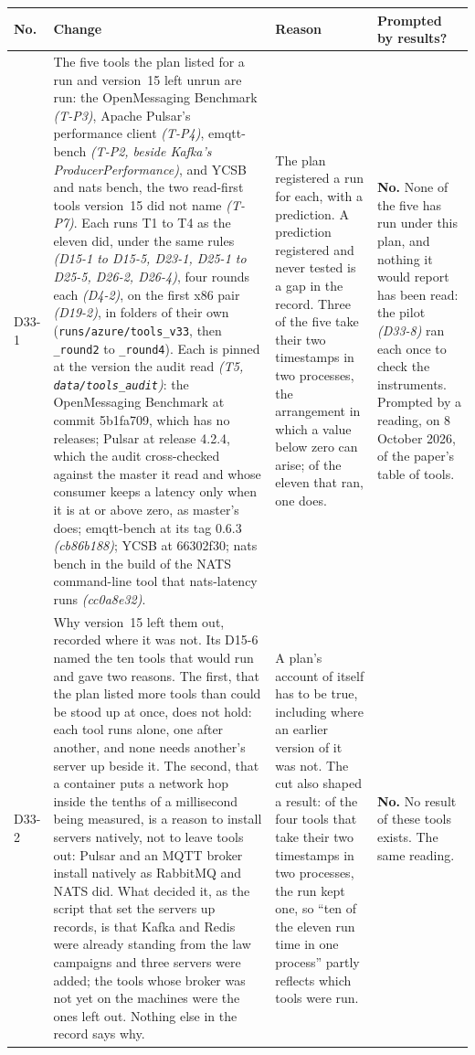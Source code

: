 \documentclass[11pt]{article}
\newcommand{\gl}[1]{{\color{soft}\itshape\small (#1)}}
\begin{document}
{\small
\begin{longtable}{@{}p{1.1cm} >{\raggedright\arraybackslash}p{6.1cm} >{\raggedright\arraybackslash}p{6.0cm} >{\raggedright\arraybackslash}p{2.2cm}@{}}
\toprule
\textbf{No.} & \textbf{Change} & \textbf{Reason} & \textbf{Prompted by results?} \\
\midrule
\endhead
D33-1 & The five tools the plan listed for a run and version~15 left unrun are run: the OpenMessaging Benchmark \gl{T-P3}, Apache Pulsar's performance client \gl{T-P4}, emqtt-bench \gl{T-P2, beside Kafka's ProducerPerformance}, and YCSB and nats bench, the two read-first tools version~15 did not name \gl{T-P7}. Each runs T1 to T4 as the eleven did, under the same rules \gl{D15-1 to D15-5, D23-1, D25-1 to D25-5, D26-2, D26-4}, four rounds each \gl{D4-2}, on the first x86 pair \gl{D19-2}, in folders of their own (\texttt{runs/azure/tools\_v33}, then \texttt{\_round2} to \texttt{\_round4}). Each is pinned at the version the audit read \gl{T5, \texttt{data/tools\_audit}}: the OpenMessaging Benchmark at commit 5b1fa709, which has no releases; Pulsar at release 4.2.4, which the audit cross-checked against the master it read and whose consumer keeps a latency only when it is at or above zero, as master's does; emqtt-bench at its tag 0.6.3 \gl{cb86b188}; YCSB at 66302f30; nats bench in the build of the NATS command-line tool that nats-latency runs \gl{cc0a8e32}. & The plan registered a run for each, with a prediction. A prediction registered and never tested is a gap in the record. Three of the five take their two timestamps in two processes, the arrangement in which a value below zero can arise; of the eleven that ran, one does. & \textbf{No.} None of the five has run under this plan, and nothing it would report has been read: the pilot \gl{D33-8} ran each once to check the instruments. Prompted by a reading, on 8 October 2026, of the paper's table of tools. \\
D33-2 & Why version~15 left them out, recorded where it was not. Its D15-6 named the ten tools that would run and gave two reasons. The first, that the plan listed more tools than could be stood up at once, does not hold: each tool runs alone, one after another, and none needs another's server up beside it. The second, that a container puts a network hop inside the tenths of a millisecond being measured, is a reason to install servers natively, not to leave tools out: Pulsar and an MQTT broker install natively as RabbitMQ and NATS did. What decided it, as the script that set the servers up records, is that Kafka and Redis were already standing from the law campaigns and three servers were added; the tools whose broker was not yet on the machines were the ones left out. Nothing else in the record says why. & A plan's account of itself has to be true, including where an earlier version of it was not. The cut also shaped a result: of the four tools that take their two timestamps in two processes, the run kept one, so ``ten of the eleven run time in one process'' partly reflects which tools were run. & \textbf{No.} No result of these tools exists. The same reading. \\

\end{longtable}}
\end{document}
